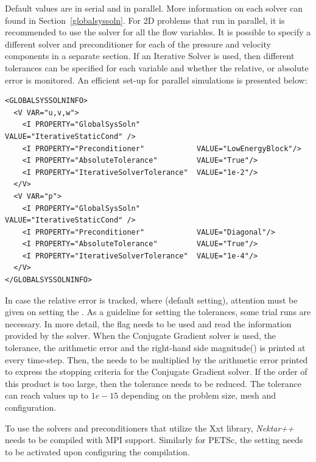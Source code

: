 \begin{itemize}
Default values are  in serial and  in parallel. More information on each solver can found in Section~\ref{globalsyssoln}. For 2D problems that run in parallel, it is recommended to use the  solver for all the flow variables. It is possible to specify a different solver and  preconditioner for each of the pressure and velocity components in a separate  section. If an Iterative Solver is used, then different tolerances can be specified for each variable and whether the relative, or absolute error is monitored. An efficient set-up for parallel simulations is presented below:  
%
\begin{lstlisting}[style=XMLStyle]
<GLOBALSYSSOLNINFO>
  <V VAR="u,v,w">
    <I PROPERTY="GlobalSysSoln"             VALUE="IterativeStaticCond" />
    <I PROPERTY="Preconditioner"            VALUE="LowEnergyBlock"/>
    <I PROPERTY="AbsoluteTolerance"         VALUE="True"/>
    <I PROPERTY="IterativeSolverTolerance"  VALUE="1e-2"/>
  </V>
  <V VAR="p">
    <I PROPERTY="GlobalSysSoln"             VALUE="IterativeStaticCond" />
    <I PROPERTY="Preconditioner"            VALUE="Diagonal"/>
    <I PROPERTY="AbsoluteTolerance"         VALUE="True"/>
    <I PROPERTY="IterativeSolverTolerance"  VALUE="1e-4"/>
  </V>
</GLOBALSYSSOLNINFO>
\end{lstlisting}

In case the relative error is tracked, where  (default setting), attention must be given on setting the . As a guideline for setting the tolerances, some trial runs are necessary. In more detail, the flag  needs to be used and read the information provided by the solver. When the Conjugate Gradient solver is used, the tolerance, the arithmetic error and the right-hand side magnitude() is printed at every time-step. Then, the  needs to be multiplied by the arithmetic error printed to express the stopping criteria for the Conjugate Gradient solver. If the order of this product is too large, then the tolerance needs to be reduced. The tolerance can reach values up to $1e-15$ depending on the problem size, mesh and configuration.

\begin{notebox}
To use the solvers and preconditioners that utilize the Xxt library, \emph{Nektar++} needs to be compiled with MPI support. Similarly for PETSc, the setting  needs to be activated upon configuring the compilation.
\end{notebox}


\end{itemize}
